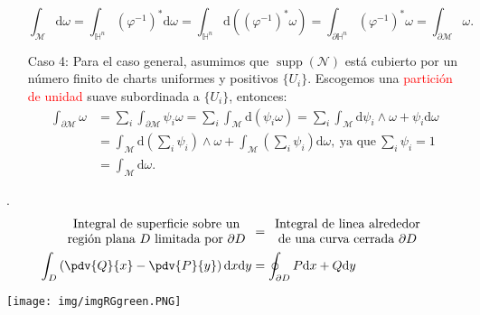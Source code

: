 \documentclass[../main]{subfiles}
\begin{document}
\begin{enumerate}[itemindent=1cm]
\begin{equation}
        \int_{\mathcal{M}} \mathrm{d}\omega = \int_{\mathbb{H}^n} (\varphi^{-1})^* \mathrm{d}\omega=\int_{\mathbb{H}^n} \mathrm{d}((\varphi^{-1})^* \omega)=\int_{\partial \mathbb{H}^n} (\varphi^{-1})^* \omega=\int_{\partial \mathcal{M}} \omega.
    \end{equation}
    \item[Caso 4:] Para el caso general, asumimos que $\operatorname{supp} (\mathcal{N})$ está cubierto por un número finito de charts uniformes y positivos $\{ U_i\}$. Escogemos una \textcolor{red}{partición de unidad} suave subordinada a $\{U_i\}$, entonces:
    \begin{equation}
        \begin{split}
            \int_{\partial\mathcal{M}}\omega&= \sum_i \int_{\partial \mathcal{M}} \psi_i \omega=\sum_i \int_{\mathcal{M}} \mathrm{d}(\psi_i \omega)=\sum_i \int_{\mathcal{M}} \mathrm{d}\psi_i \wedge \omega+\psi_i \mathrm{d}\omega \\
            &=\int_{\mathcal{M}} \mathrm{d}\left(\sum_i \psi_i\right) \wedge \omega+ \int_{\mathcal{M}} \left(\sum_i \psi_i\right)\mathrm{d}\omega,\ \text{ya que} \ \sum_i \psi_i=1\\
            &=\int_{\mathcal{M}} \mathrm{d}\omega.
        \end{split}
    \end{equation}
\end{enumerate}

\teorema{\textcolor{red}{Teorema de Green}}. 
\begin{equation}
    \begin{split}
        \begin{array}{c}
            \text{Integral de superficie sobre un} \\
            \text{región plana}\ D \ \text{limitada por}\ \partial D
        \end{array}
        &=
        \begin{array}{c}
            \text{Integral de linea alrededor} \\
            \text{de una curva cerrada} \ \partial D
        \end{array} 
        \\
        \int_D \left(\pdv{Q}{x}-\pdv{P}{y}\right)\mathrm{d}x\mathrm{d}y&=\oint_{\partial D}P\mathrm{d}x+Q\mathrm{d}y   
    \end{split}
\end{equation}

\begin{center}
    \texttt{[image: img/imgRGgreen.PNG]}
\end{center}
\end{document}
